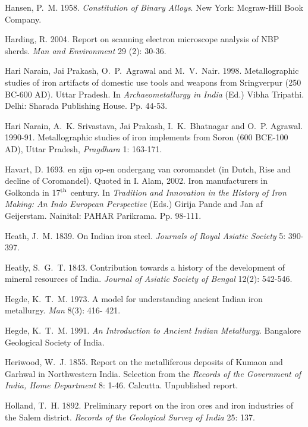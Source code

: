 \begin{thebibliography}{99}
 Hansen, P.~M. 1958. \textit{Constitution of Binary Alloys}. New York: Mcgraw-Hill Book Company.

 Harding, R. 2004. Report on scanning electron microscope analysis of NBP sherds. \textit{Man and Environment} 29 (2): 30-36.

 Hari Narain, Jai Prakash, O.~P.~Agrawal and M.~V.~Nair. 1998. Metallographic studies of iron artifacts of domestic use tools and weapons from Sringverpur (250 BC-600 AD). Uttar Pradesh. In \textit{Archaeometallurgy in India} (Ed.) Vibha Tripathi. Delhi: Sharada Publishing House. Pp. 44-53.

 Hari Narain, A.~K. Srivastava, Jai Prakash, I.~K.~Bhatnagar and O.~P. Agrawal. 1990-91. Metallographic studies of iron implements from Soron (600 BCE-100 AD), Uttar Pradesh, \textit{Pragdhara} 1: 163-171. 

 Havart, D. 1693. en zijn op-en ondergang van coromandet (in Dutch,  Rise and decline of Coromandel). Quoted in I. Alam, 2002. Iron manufacturers in Golkonda in 17$^{\rm th}$ century. In \textit{Tradition and Innovation in the History of Iron Making: An Indo European Perspective} (Eds.) Girija Pande and Jan af Geijerstam. Nainital: PAHAR Parikrama. Pp. 98-111.

 Heath, J.~M. 1839. On Indian iron steel. \textit{Journals of Royal Asiatic Society} 5: 390-397.

 Heatly, S.~G.~T. 1843. Contribution towards a history of the development of mineral resources of India. \textit{Journal of Asiatic Society of Bengal} 12(2): 542-546.

 Hegde, K.~T.~M. 1973. A model for understanding ancient Indian iron metallurgy. \textit{Man} 8(3): 416- 421.

 Hegde, K.~T.~M. 1991. \textit{An Introduction to Ancient Indian Metallurgy}. Bangalore Geological Society of India.

 Heriwood, W.~J. 1855. Report on the metalliferous deposits of Kumaon and Garhwal in Northwestern India. Selection from the \textit{Records of the Government of India, Home Department} 8: 1-46. Calcutta. Unpublished report.

 Holland, T.~H. 1892. Preliminary report on the iron ores and iron industries of the Salem district. \textit{Records of the Geological Survey of India} 25: 137. 


\end{thebibliography}
